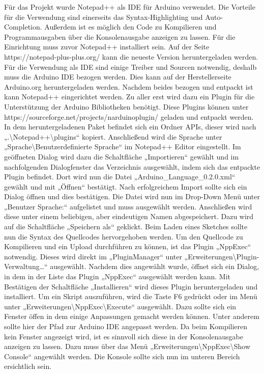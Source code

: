 Für das Projekt wurde Notepad++ als IDE für Arduino verwendet. Die Vorteile für die Verwendung sind einerseits das Syntax-Highlighting und Auto-Completion. Außerdem ist es möglich den Code zu Kompilieren und Programmausgaben über die Konsolenausgabe anzeigen zu lassen.
Für die Einrichtung muss zuvor Notepad++ installiert sein. Auf der Seite https://notepad-plus-plus.org/ kann die neueste Version heruntergeladen werden. Für die Verwendung als IDE sind einige Treiber und Sourcen notwendig, deshalb muss die Arduino IDE bezogen werden. Dies kann auf der Herstellerseite Arduino.org heruntergeladen werden. Nachdem beides bezogen und entpackt ist kann Notepad++ eingerichtet werden. Zu aller erst wird dazu ein Plugin für die Unterstützung der Arduino Bibliotheken benötigt. Diese Plugins können unter https://sourceforge.net/projects/narduinoplugin/ geladen und entpackt werden. In dem heruntergeladenen Paket befindet sich ein Ordner APIs, dieser wird nach „.\textbackslash{}Notepad++\textbackslash{}plugins“ kopiert. Anschließend wird die Sprache unter „Sprache\textbackslash{}Benutzerdefinierte Sprache“ im Notepad++ Editor eingestellt. Im geöffneten Dialog wird dazu die Schaltfläche „Importieren“ gewählt und im nachfolgenden Dialogfenster das Verzeichnis ausgewählt, indem sich das entpackte Plugin befindet. Dort wird nun die Datei „Arduino\_Language\_0.2.0.xml“ gewählt und mit „Öffnen“ bestätigt. Nach erfolgreichem Import sollte sich ein Dialog öffnen und dies bestätigen. Die Datei wird nun im Drop-Down Menü unter „Benutzer Sprache:“ aufgelistet und muss ausgewählt werden. Anschließen wird diese unter einem beliebigen, aber eindeutigen Namen abgespeichert. Dazu wird auf die Schaltfläche „Speichern als“ geklickt. Beim Laden eines Sketches sollte nun die Syntax des Quellcodes hervorgehoben werden.
Um den Quellcode zu Kompilieren und ein Upload durchführen zu können, ist das Plugin „NppExec“ notwendig. Dieses wird direkt im „PluginManager“ unter „Erweiterungen\textbackslash{}Plugin-Verwaltung…“ ausgewählt. Nachdem dies angewählt wurde, öffnet sich ein Dialog, in dem in der Liste das Plugin „NppExec“ ausgewählt werden kann. Mit Bestätigen der Schaltfläche „Installieren“ wird dieses Plugin heruntergeladen und installiert. Um ein Skript auszuführen, wird die Taste F6 gedrückt oder im Menü unter „Erweiterungen\textbackslash{}NppExec\textbackslash{}Execute“ ausgewählt. Dazu sollte sich ein Fenster öffen in dem einige Anpassungen gemacht werden können. Unter anderem sollte hier der Pfad zur Arduino IDE angepasst werden. Da beim Kompilieren kein Fenster angezeigt wird, ist es sinnvoll sich diese in der Konsolenausgabe anzeigen zu lassen. Dazu muss über das Menü „Erweiterungen\textbackslash{}NppExec\textbackslash{}Show Console“ angewählt werden. Die Konsole sollte sich nun im unteren Bereich ersichtlich sein.

